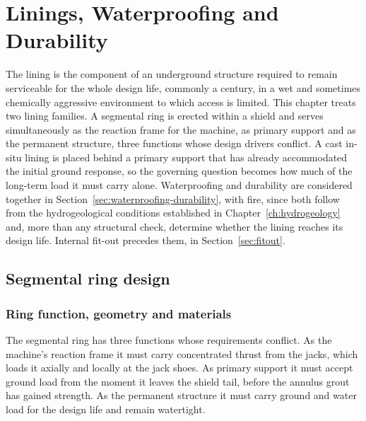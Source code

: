 \chapter{Linings, Waterproofing and Durability}
\label{ch:linings}

The lining is the component of an underground structure required to remain
serviceable for the whole design life, commonly a century, in a wet and
sometimes chemically aggressive environment to which access is limited. This
chapter treats two lining families. A segmental ring is erected within a
shield and serves simultaneously as the reaction frame for the machine, as
primary support and as the permanent structure, three functions whose design
drivers conflict. A cast in-situ lining is placed behind a primary support
that has already accommodated the initial ground response, so the governing
question becomes how much of the long-term load it must carry alone.
Waterproofing and durability are considered together in
Section~\ref{sec:waterproofing-durability}, with fire, since both
follow from the hydrogeological conditions established in
Chapter~\ref{ch:hydrogeology} and, more than any structural check, determine
whether the lining reaches its design life. Internal fit-out precedes them,
in Section~\ref{sec:fitout}.

\section{Segmental ring design}
\label{sec:segmental-ring}

\subsection{Ring function, geometry and materials}
\label{sec:ring-function}

The segmental ring has three functions whose requirements conflict. As the machine's
reaction frame it must carry concentrated thrust from the jacks, which loads it
axially and locally at the jack shoes. As primary support it must accept ground
load from the moment it leaves the shield tail, before the annulus grout has
gained strength. As the permanent structure it must carry ground and water load
for the design life and remain watertight.

